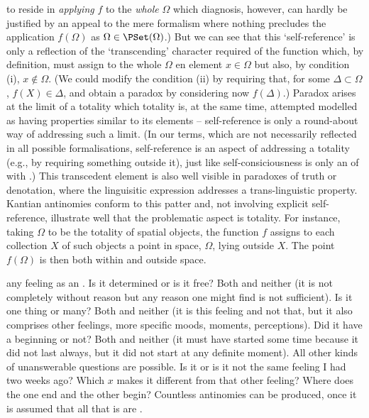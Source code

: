 {{    to reside in {\em applying} $f$ to the {\em whole} $\Omega$ which diagnosis,
    however, can hardly be justified by an appeal to the mere formalism where
    nothing precludes the application $f(\Omega)$ as $\Omega\in\PSet(\Omega)$.)
    But we can see that this `self-reference' is only a reflection of the
    `transcending' character required of the function which, by definition, must
    assign to the whole $\Omega$ en element $x\in\Omega$ but also, by condition
    (i), $x\not\in\Omega$. (We could modify the condition (ii) by requiring
    that, for some $\Delta\subset\Omega$, $f(X)\in\Delta$, and obtain a paradox
    by considering now $f(\Delta)$.) Paradox arises at the limit of a totality
    which totality is, at the same time, attempted modelled as having properties
    similar to its elements -- self-reference is only a round-about way of
    addressing such a limit. (In our terms, which are not necessarily reflected
    in all possible formalisations, self-reference is an aspect of addressing a
    totality (e.g., by requiring something outside it), just like
    self-consiciousness is only an  of  with
    .) This transcedent element is also well visible in
    paradoxes of truth or denotation, where the linguisitic expression addresses
    a trans-linguistic property. Kantian antinomies conform to this patter and,
    not involving explicit self-reference, illustrate well that the problematic
    aspect is totality. For instance, taking $\Omega$ to be the totality of
    spatial objects, the function $f$ assigns to each collection $X$ of such
    objects a point in space, $\Omega$, lying outside $X$. The point $f(\Omega)$
    is then both within and outside space.\label{after:paradox}}}

 any feeling as an . Is it determined or is it free?
Both and neither (it is not completely without reason but any reason one might
find is not sufficient). Is it one thing or many?  Both and neither (it is this
feeling and not that, but it also comprises other feelings, more specific moods,
moments, perceptions).  Did it have a beginning or not? Both and neither (it must
have started some time because it did not last always, but it did not start at
any definite moment). All other kinds of unanswerable 
questions are possible. Is it or is it not the same feeling I had two weeks
ago? Which $x$ makes it different from that other feeling? Where does the one
end and the other begin? Countless antinomies can be produced, once it is
assumed that all that is are .

